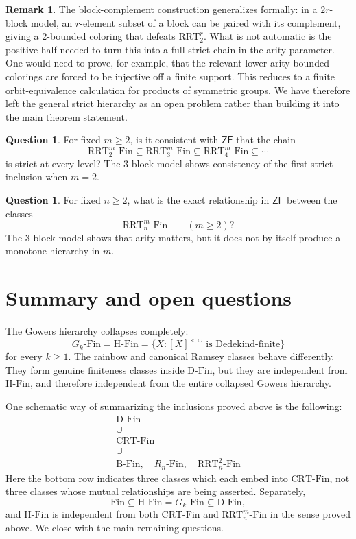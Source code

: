 \documentclass[10pt,a4paper]{amsart}
\theoremstyle{definition}
\newtheorem{remark}[theorem]{Remark}
\newtheorem{question}[theorem]{Question}
\newcommand{\ZF}{\mathsf{ZF}}
\newcommand{\Fin}{\mathrm{Fin}}
\newcommand{\DFin}{\mathrm{D\text{-}Fin}}
\newcommand{\BFin}{\mathrm{B\text{-}Fin}}
\newcommand{\HFin}{\mathrm{H\text{-}Fin}}
\newcommand{\RnFin}[1]{R_{#1}\text{-}\mathrm{Fin}}
\newcommand{\RRT}{\mathrm{RRT}}
\newcommand{\CRT}{\mathrm{CRT}}
\newcommand{\RRTFin}[2]{\RRT^{#1}_{#2}\text{-}\mathrm{Fin}}
\newcommand{\CRTFin}{\CRT\text{-}\mathrm{Fin}}
\begin{document}
\begin{remark}
The block-complement construction generalizes formally: in a \(2r\)-block model, an \(r\)-element subset of a block can be paired with its complement, giving a \(2\)-bounded coloring that defeats \(\RRT^r_2\).  What is not automatic is the positive half needed to turn this into a full strict chain in the arity parameter.  One would need to prove, for example, that the relevant lower-arity bounded colorings are forced to be injective off a finite support.  This reduces to a finite orbit-equivalence calculation for products of symmetric groups.  We have therefore left the general strict hierarchy as an open problem rather than building it into the main theorem statement.
\end{remark}

\begin{question}
For fixed \(m\geq 2\), is it consistent with \(\ZF\) that the chain
\[
    \RRTFin{m}{2}
    \subseteq
    \RRTFin{m}{3}
    \subseteq
    \RRTFin{m}{4}
    \subseteq\cdots
\]
is strict at every level?  The \(3\)-block model shows consistency of the first strict inclusion when \(m=2\).
\end{question}

\begin{question}\label{q:m-direction}
For fixed \(n\geq 2\), what is the exact relationship in \(\ZF\) between the classes
\[
    \RRTFin{m}{n}\qquad (m\geq 2)?
\]
The \(3\)-block model shows that arity matters, but it does not by itself produce a monotone hierarchy in \(m\).
\end{question}

\section{Summary and open questions}

The Gowers hierarchy collapses completely:
\[
    G_k\text{-}\Fin=\HFin=\{X:[X]^{<\omega}\text{ is Dedekind-finite}\}
\]
for every \(k\geq 1\).  The rainbow and canonical Ramsey classes behave differently.  They form genuine finiteness classes inside \(\DFin\), but they are independent from \(\HFin\), and therefore independent from the entire collapsed Gowers hierarchy.

One schematic way of summarizing the inclusions proved above is the following:
\[
\begin{array}{c}
\DFin \\[0.6em]
\cup \\[0.2em]
\CRTFin \\[0.6em]
\cup \\[0.2em]
\BFin,\quad \RnFin{n},\quad \RRTFin{2}{n}
\end{array}
\]
Here the bottom row indicates three classes which each embed into \(\CRTFin\), not three classes whose mutual relationships are being asserted.  Separately,
\[
    \Fin\subseteq \HFin=G_k\text{-}\Fin\subseteq \DFin,
\]
and \(\HFin\) is independent from both \(\CRTFin\) and \(\RRTFin{m}{n}\) in the sense proved above.
We close with the main remaining questions.
\end{document}
